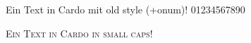 \documentclass{article}
\begin{document}
\huge

Ein Text in Cardo mit old style (+onum)!  01234567890

\textsc{Ein Text in Cardo in small caps!}
\end{document}
